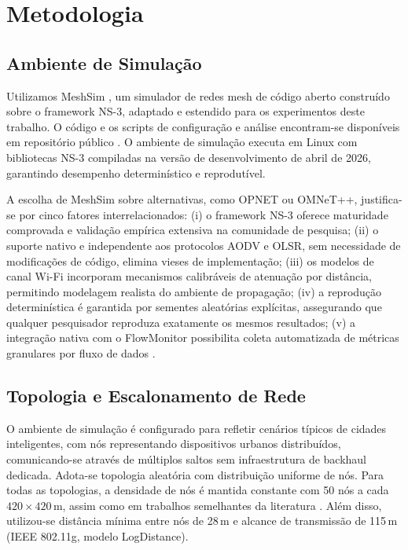 \documentclass[12pt]{article}
\begin{document}
\section{Metodologia}\label{sec:methodology}

\subsection{Ambiente de Simulação}

Utilizamos MeshSim \cite{lorinder_github}, um simulador de redes mesh de código aberto construído sobre o framework NS-3, adaptado e estendido para os experimentos deste trabalho. O código e os scripts de configuração e análise encontram-se disponíveis em repositório público \cite{caburlao_github}. O ambiente de simulação executa em Linux com bibliotecas NS-3 compiladas na versão de desenvolvimento de abril de 2026, garantindo desempenho determinístico e reprodutível.

A escolha de MeshSim sobre alternativas, como OPNET ou OMNeT++, justifica-se por cinco fatores interrelacionados: (i) o framework NS-3 oferece maturidade comprovada e validação empírica extensiva na comunidade de pesquisa; (ii) o suporte nativo e independente aos protocolos AODV e OLSR, sem necessidade de modificações de código, elimina vieses de implementação; (iii) os modelos de canal Wi-Fi incorporam mecanismos calibráveis de atenuação por distância, permitindo modelagem realista do ambiente de propagação; (iv) a reprodução determinística é garantida por sementes aleatórias explícitas, assegurando que qualquer pesquisador reproduza exatamente os mesmos resultados; (v) a integração nativa com o FlowMonitor possibilita coleta automatizada de métricas granulares por fluxo de dados \cite{kim2011comparative}.

\subsection{Topologia e Escalonamento de Rede}

O ambiente de simulação é configurado para refletir cenários típicos de cidades inteligentes, com nós representando dispositivos urbanos distribuídos, comunicando-se através de múltiplos saltos sem infraestrutura de backhaul dedicada.  Adota-se topologia aleatória com distribuição uniforme de nós. Para todas as topologias, a densidade de nós é mantida constante com 50 nós a cada $420 \times 420$\,m, assim como em trabalhos semelhantes da literatura \cite{turlykozhayeva2024evaluating}. Além disso, utilizou-se distância mínima entre nós de 28\,m e alcance de transmissão de 115\,m (IEEE 802.11g, modelo LogDistance).
\end{document}

